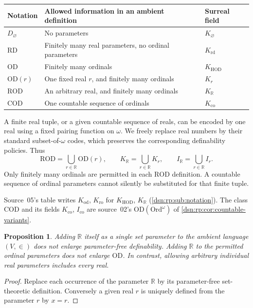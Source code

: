 \documentclass[11pt,a4paper]{article}
\numberwithin{equation}{section}
\newtheorem{proposition}[proposition]{Proposition}
\theoremstyle{definition}
\theoremstyle{remark}
\newcommand{\Ord}{\mathrm{Ord}}
\newcommand{\OD}{\mathrm{OD}}
\newcommand{\HOD}{\mathrm{HOD}}
\newcommand{\R}{\mathbb R}
\newcommand{\KH}{K_{\HOD}}
\newcommand{\ROD}{\mathrm{ROD}}
\newcommand{\COD}{\mathrm{COD}}
\newcommand{\RD}{\mathrm{RD}}
\newcommand{\KR}{K_{\R}}
\newcommand{\IR}{I_{\R}}
\newcommand{\Kco}{K_{\mathrm{co}}}
\newcommand{\Ico}{I_{\mathrm{co}}}
\begin{document}
\begin{center}
\small
\begin{tabular}{@{}P{0.18\textwidth}P{0.47\textwidth}P{0.27\textwidth}@{}}
\toprule
Notation & Allowed information in an ambient definition & Surreal field\\
\midrule
$D_\varnothing$ & No parameters & $K_\varnothing$\\
$\RD$ & Finitely many real parameters, no ordinal parameters & $K_{\mathrm{rd}}$\\
$\OD$ & Finitely many ordinals & $\KH$\\
$\OD(r)$ & One fixed real $r$, and finitely many ordinals & $K_r$\\
$\ROD$ & An arbitrary real, and finitely many ordinals & $\KR$\\
$\COD$ & One countable sequence of ordinals & $\Kco$\\
\bottomrule
\end{tabular}
\end{center}

A finite real tuple, or a given countable sequence of reals, can be encoded
by one real using a fixed pairing function on $\omega$. We freely replace
real numbers by their standard subset-of-$\omega$ codes, which preserves
the corresponding definability policies. Thus
\begin{equation}\label{dsn:ca:eq:rodunion}
 \ROD=\bigcup_{r\in\R}\OD(r),\qquad
 \KR=\bigcup_{r\in\R}K_r,\qquad
 \IR=\bigcup_{r\in\R}I_r.
\end{equation}
Only finitely many ordinals are permitted in each $\ROD$ definition.
A countable sequence of ordinal parameters cannot silently be substituted
for that finite tuple.

\begin{center}\small
Source~05's table writes $K_{\mathrm{od}}$, $K_{\mathrm{ro}}$ for $\KH$, $\KR$
(\cref{dsn:rp:sub:notation}). The class $\COD$ and its fields $\Kco$, $\Ico$
are source~02's $\OD(\Ord^\omega)$ of \cref{dsn:rp:cor:countable-variants}.
\end{center}

\begin{proposition}\label{dsn:ca:prop:realset}
Adding $\R$ itself as a single set parameter to the ambient language
$(V,\in)$ does not enlarge parameter-free definability. Adding $\R$ to
the permitted ordinal parameters does not enlarge $\OD$. In contrast,
allowing arbitrary individual real parameters includes every real.
\end{proposition}
\begin{proof}
Replace each occurrence of the parameter $\R$ by its parameter-free
set-theoretic definition. Conversely a given real $r$ is uniquely defined
from the parameter $r$ by $x=r$.
\end{proof}
\end{document}
